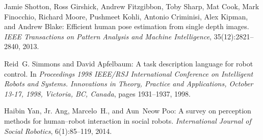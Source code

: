 \documentclass{llncs}
\begin{document}
\begin{thebibliography}{4}
Jamie Shotton, Ross Girshick, Andrew Fitzgibbon, Toby Sharp, Mat Cook, Mark Finocchio, Richard Moore, Pushmeet Kohli, Antonio Criminisi, Alex Kipman, and Andrew Blake: Efficient human pose estimation from single depth images. {\em IEEE Transactions on Pattern Analysis and Machine Intelligence}, 35(12):2821--2840, 2013.

Reid~G. Simmons and David Apfelbaum: A task description language for robot control. In {\em Proceedings 1998 {IEEE/RSJ} International Conference on Intelligent Robots and Systems. Innovations in Theory, Practice and Applications, October 13-17, 1998, Victoria, BC, Canada}, pages 1931--1937, 1998.

Haibin Yan, Jr. Ang, Marcelo~H., and Aun~Neow Poo: A survey on perception methods for human–robot interaction in social robots. {\em International Journal of Social Robotics}, 6(1):85--119, 2014.

\end{thebibliography}
\end{document}
